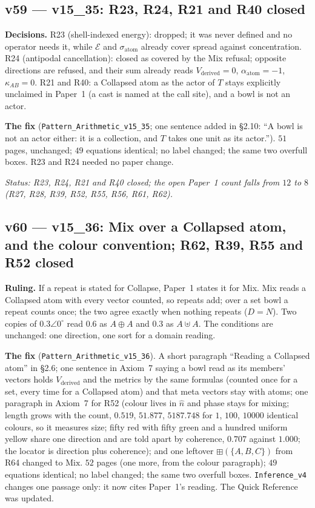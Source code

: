 \documentclass[11pt]{article}
\begin{document}
\subsection*{v59 --- v15\_35: R23, R24, R21 and R40 closed}
\textbf{Decisions.} R23 (shell-indexed energy): dropped; it was never defined and no operator needs it, while $\mathcal E$ and $\sigma_{\text{atom}}$ already cover spread against concentration. R24 (antipodal cancellation): closed as covered by the Mix refusal; opposite directions are refused, and their sum already reads $V_{\text{derived}}=0$, $\alpha_{\text{atom}}=-1$, $\kappa_{AB}=0$. R21 and R40: a Collapsed atom as the actor of $T$ stays explicitly unclaimed in Paper~1 (a cast is named at the call site), and a bowl is not an actor.

\textbf{The fix} (\texttt{Pattern\_Arithmetic\_v15\_35}; one sentence added in \S2.10: ``A bowl is not an actor either: it is a collection, and $T$ takes one unit as its actor.''). $51$ pages, unchanged; $49$ equations identical; no label changed; the same two overfull boxes. R23 and R24 needed no paper change.

\emph{Status: R23, R24, R21 and R40 closed; the open Paper~1 count falls from $12$ to $8$ (R27, R28, R39, R52, R55, R56, R61, R62).}

\subsection*{v60 --- v15\_36: Mix over a Collapsed atom, and the colour convention; R62, R39, R55 and R52 closed}
\textbf{Ruling.} If a repeat is stated for Collapse, Paper~1 states it for Mix. Mix reads a Collapsed atom with every vector counted, so repeats add; over a set bowl a repeat counts once; the two agree exactly when nothing repeats ($D=N$). Two copies of $0.3\angle0^\circ$ read $0.6$ as $A\oplus A$ and $0.3$ as $A\uplus A$. The conditions are unchanged: one direction, one sort for a domain reading.

\textbf{The fix} (\texttt{Pattern\_Arithmetic\_v15\_36}). A short paragraph ``Reading a Collapsed atom'' in \S2.6; one sentence in Axiom~7 saying a bowl read as its members' vectors holds $V_{\text{derived}}$ and the metrics by the same formulas (counted once for a set, every time for a Collapsed atom) and that meta vectors stay with atoms; one paragraph in Axiom~7 for R52 (colour lives in $\hat n$ and phase stays for mixing; length grows with the count, $0.519$, $51.877$, $5187.748$ for $1$, $100$, $10000$ identical colours, so it measures size; fifty red with fifty green and a hundred uniform yellow share one direction and are told apart by coherence, $0.707$ against $1.000$; the locator is direction plus coherence); and one leftover $\boxplus(\{A,B,C\})$ from R64 changed to $\mathrm{Mix}$. $52$ pages (one more, from the colour paragraph); $49$ equations identical; no label changed; the same two overfull boxes. \texttt{Inference\_v4} changes one passage only: it now cites Paper~1's reading. The Quick Reference was updated.
\end{document}
